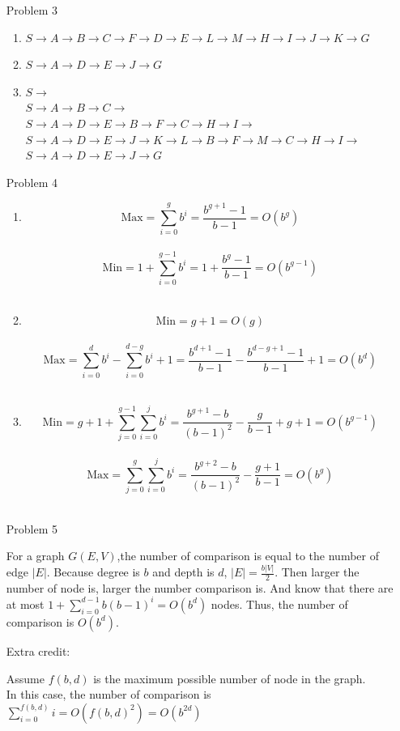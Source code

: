 \normalfont\documentclass[letterpaper,11pt]{article}
\begin{document}
\begin{enumerate}
\item [Problem 3]\par
	\begin{enumerate}
		\item $S\to A\to B\to C\to F\to D\to E\to L\to M\to H\to I\to J\to K\to G$

		\item $S\to A\to D\to E\to J\to G$

		\item $S\to$\\
		$S\to A\to B\to C\to$\\
		$S\to A\to D\to E\to B\to F\to C\to H\to I\to$\\
		$S\to A\to D\to E\to J\to K\to L\to B\to F\to M\to C\to H\to I\to$\\
		$S\to A\to D\to E\to J\to G$
	\end{enumerate}
\item[Problem 4]\par
	\begin{enumerate}
		\item 
			$$\text{Max} = \sum_{i=0}^g{b^i} = \frac{b^{g+1} - 1}{b - 1} = O(b^g)$$\\
			$$\text{Min} = 1 + \sum_{i=0}^{g-1}{b^i} = 1 + \frac{b^{g} - 1}{b - 1} = O(b^{g-1})$$\\
		\item
			$$\text{Min} = g + 1 = O(g)$$\\
			$$\text{Max} = \sum_{i=0}^d{b^i} - \sum_{i=0}^{d-g}{b^i} + 1 = \frac{b^{d + 1} - 1}{b - 1} - \frac{b^{d-g + 1} - 1}{b - 1} + 1 = O(b^d)$$\\
		\item
			$$\text{Min} = g + 1 + \sum_{j=0}^{g-1}\sum_{i=0}^j{b^i} = \frac{b^{g+1} - b}{(b-1)^2} - \frac{g}{b-1} + g + 1 = O(b^{g-1})$$\\
			$$\text{Max} = \sum_{j=0}^{g}\sum_{i=0}^j{b^i} = \frac{b^{g+2} - b}{(b-1)^2} - \frac{g+1}{b-1} = O(b^g)$$\\
	\end{enumerate}
\item [Problem 5]\par
		For a graph $G(E,V)$,the number of comparison is equal to the number of edge $|E|$. Because degree is $b$ and depth is $d$, $|E| = \frac{b|V|}{2}$. Then larger the number of node is, larger the number comparison is. And know that there are at most $1 + \sum_{i=0}^{d-1}{b(b-1)^i} = O(b^d)$ nodes. Thus, the number of comparison is $O(b^d)$.\par
		Extra credit:\par
			Assume $f(b,d)$ is the maximum possible number of node in the graph.\\
			In this case, the number of comparison is $\sum_{i=0}^{f(b,d)}i = O(f(b,d)^2) = O(b^{2d})$



\end{enumerate}
\end{document}
